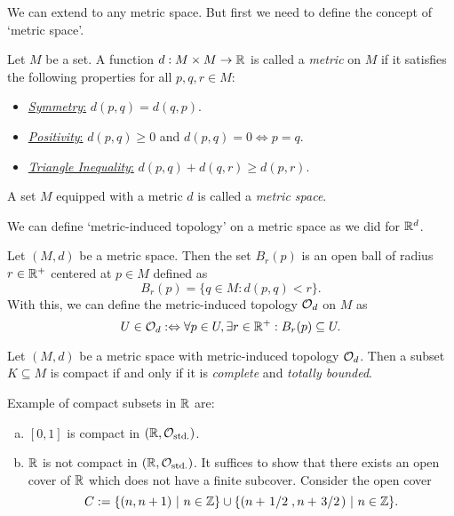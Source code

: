We can extend  to any metric space. But first we need to define the concept of `metric space'.

\begin{definition}
	Let \(M\) be a set. A function \(d: M \times M \to \mathbb R\) is called a \emph{metric} on \(M\) if it satisfies the following properties for all \(p, q, r \in M\):
	\begin{itemize}
		\item \uline{\emph{Symmetry}:} \(d(p, q) = d(q, p)\).
		\item \uline{\emph{Positivity}:} \(d(p, q) \geq 0\) and \(d(p, q) = 0 \iff p = q\).
		\item \uline{\emph{Triangle Inequality}:} \(d(p, q) + d(q, r) \geq d(p, r)\).
	\end{itemize}
	A set \(M\) equipped with a metric \(d\) is called a \emph{metric space}.
\end{definition}

We can define `metric-induced topology' on a metric space as we did for \(\mathbb R^d\).

\begin{remark}
	Let \((M, d)\) be a metric space. Then the set \(B_r(p)\) is an open ball of radius \(r \in \mathbb R^+\) centered at \(p \in M\) defined as
	\begin{equation}
		B_r(p) = \{q \in M: d(p, q) < r\}. \label{eq:open_ball}
	\end{equation}
	With this, we can define the metric-induced topology \(\mathcal{O}_d\) on \(M\) as
	\begin{equation}
		U \in \mathcal{O}_d :\Leftrightarrow \forall p \in U, \exists r \in \mathbb R^+: B_r(p) \subseteq U. \label{eq:metric_induced_topology}
	\end{equation}
\end{remark}

\begin{theorem}\label{thm:generalized_heine_borel}
	Let \((M, d)\) be a metric space with metric-induced topology \(\mathcal{O}_d\). Then a subset \(K \subseteq M\) is compact if and only if it is \emph{complete} and \emph{totally bounded}.
\end{theorem}

\begin{example}
	Example of compact subsets in \(\mathbb R\) are:
	\begin{enumerate}[(a)]
		\item \([0, 1]\) is compact in \((\mathbb R, \mathcal{O}_{\text{std.}})\).

		\item \(\mathbb R\) is not compact in \((\mathbb R, \mathcal{O}_{\text{std.}})\). It suffices to show that there exists an open cover of \(\mathbb R\) which does not have a finite subcover. Consider the open cover
		      \begin{equation}
			      C := \qty{(n, n + 1) \mid n \in \Z} \cup \qty{(n + \fhalf, n + \flatfrac{3}{2}) \mid n \in \Z}.
		      \end{equation}
	\end{enumerate}
\end{example}

